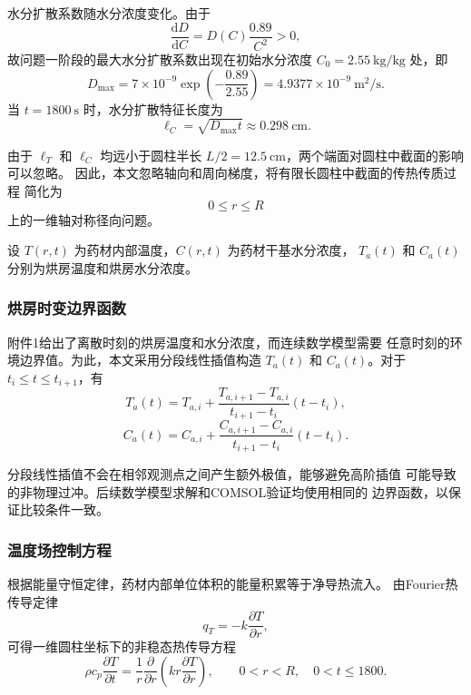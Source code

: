 \documentclass[12pt,a4paper]{article}
\begin{document}
水分扩散系数随水分浓度变化。由于
\begin{equation}
\frac{\mathrm{d}D}{\mathrm{d}C}
=
D(C)\frac{0.89}{C^2}>0,
\end{equation}
故问题一阶段的最大水分扩散系数出现在初始水分浓度
$C_0=2.55\ \mathrm{kg/kg}$ 处，即
\begin{equation}
D_{\max}
=
7\times10^{-9}
\exp\left(-\frac{0.89}{2.55}\right)
=
4.9377\times10^{-9}\ \mathrm{m^2/s}.
\end{equation}
当 $t=1800\ \mathrm{s}$ 时，水分扩散特征长度为
\begin{equation}
\ell_C=\sqrt{D_{\max}t}\approx0.298\ \mathrm{cm}.
\end{equation}

由于 $\ell_T$ 和 $\ell_C$ 均远小于圆柱半长
$L/2=12.5\ \mathrm{cm}$，两个端面对圆柱中截面的影响可以忽略。
因此，本文忽略轴向和周向梯度，将有限长圆柱中截面的传热传质过程
简化为
\begin{equation}
0\le r\le R
\end{equation}
上的一维轴对称径向问题。

设 $T(r,t)$ 为药材内部温度，$C(r,t)$ 为药材干基水分浓度，
$T_a(t)$ 和 $C_a(t)$ 分别为烘房温度和烘房水分浓度。

\subsubsection{烘房时变边界函数}

附件1给出了离散时刻的烘房温度和水分浓度，而连续数学模型需要
任意时刻的环境边界值。为此，本文采用分段线性插值构造
$T_a(t)$ 和 $C_a(t)$。对于 $t_i\le t\le t_{i+1}$，有
\begin{equation}
T_a(t)
=
T_{a,i}
+
\frac{T_{a,i+1}-T_{a,i}}{t_{i+1}-t_i}
(t-t_i),
\end{equation}
\begin{equation}
C_a(t)
=
C_{a,i}
+
\frac{C_{a,i+1}-C_{a,i}}{t_{i+1}-t_i}
(t-t_i).
\end{equation}

分段线性插值不会在相邻观测点之间产生额外极值，能够避免高阶插值
可能导致的非物理过冲。后续数学模型求解和COMSOL验证均使用相同的
边界函数，以保证比较条件一致。

\subsubsection{温度场控制方程}

根据能量守恒定律，药材内部单位体积的能量积累等于净导热流入。
由Fourier热传导定律
\begin{equation}
q_T=-k\frac{\partial T}{\partial r},
\end{equation}
可得一维圆柱坐标下的非稳态热传导方程
\begin{equation}
\boxed{
\rho c_p\frac{\partial T}{\partial t}
=
\frac{1}{r}
\frac{\partial}{\partial r}
\left(
kr\frac{\partial T}{\partial r}
\right)
},
\qquad
0<r<R,\quad 0<t\le1800.
\label{eq:q1-heat}
\end{equation}
\end{document}
